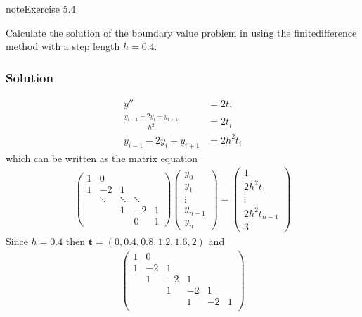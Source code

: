 \documentclass[letterpaper,10pt,english]{jupyterBook}
\begin{document}
\begin{sphinxadmonition}{note}{Exercise 5.4}

\sphinxAtStartPar
Calculate the solution of the boundary value problem in {\hyperref[\detokenize{5_BVPs/5.4_BVP_exercises:ex5-4}]{}} using the finite\sphinxhyphen{}difference method with a step length \(h=0.4\).
\subsubsection*{Solution}
\begin{align*}
    y'' &= 2t, \\
    \frac{y_{i-1} - 2 y_i + y_{i+1}}{h^2} &= 2 t_i \\
    y_{i-1} - 2y_i + y_{i+1} &= 2 h^2 t_i
\end{align*}
\sphinxAtStartPar
which can be written as the matrix equation
\begin{align*}
    \begin{pmatrix} 
        1 & 0 \\
        1 & -2 & 1 \\
        & \ddots & \ddots & \ddots \\
        & & 1 & -2 & 1 \\
        & & & 0 & 1
    \end{pmatrix}
    \begin{pmatrix} y_0 \\ y_1 \\ \vdots \\ y_{n-1} \\ y_{n} \end{pmatrix} =
    \begin{pmatrix} 1 \\ 2 h^2 t_1 \\ \vdots \\ 2 h^2 t_{n-1} \\ 3 \end{pmatrix}
\end{align*}
\sphinxAtStartPar
Since \(h=0.4\) then \(\mathbf{t} = (0, 0.4, 0.8, 1.2, 1.6, 2)\) and
\begin{align*}
    \begin{pmatrix} 
        1 & 0 \\
        1 & -2 & 1 \\
        & 1 & -2 & 1 \\
        & & 1 & -2 & 1 \\
        & & & 1 & -2 & 1 \\

\end{pmatrix}
\end{align*}
\end{sphinxadmonition}
\end{document}

